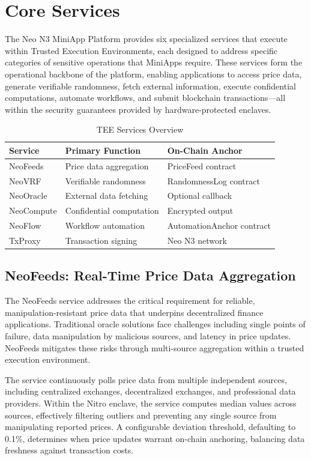 \documentclass[11pt,a4paper]{article}
\begin{document}
\section{Core Services}

The Neo N3 MiniApp Platform provides six specialized services that execute within Trusted Execution Environments, each designed to address specific categories of sensitive operations that MiniApps require. These services form the operational backbone of the platform, enabling applications to access price data, generate verifiable randomness, fetch external information, execute confidential computations, automate workflows, and submit blockchain transactions---all within the security guarantees provided by hardware-protected enclaves.

\begin{table}[h]
\centering
\caption{TEE Services Overview}
\begin{tabular}{@{}lll@{}}
\toprule
\textbf{Service} & \textbf{Primary Function} & \textbf{On-Chain Anchor} \\
\midrule
NeoFeeds & Price data aggregation & PriceFeed contract \\
NeoVRF & Verifiable randomness & RandomnessLog contract \\
NeoOracle & External data fetching & Optional callback \\
NeoCompute & Confidential computation & Encrypted output \\
NeoFlow & Workflow automation & AutomationAnchor contract \\
TxProxy & Transaction signing & Neo N3 network \\
\bottomrule
\end{tabular}
\label{tab:tee-services}
\end{table}

\subsection{NeoFeeds: Real-Time Price Data Aggregation}

The NeoFeeds service addresses the critical requirement for reliable, manipulation-resistant price data that underpins decentralized finance applications. Traditional oracle solutions face challenges including single points of failure, data manipulation by malicious sources, and latency in price updates. NeoFeeds mitigates these risks through multi-source aggregation within a trusted execution environment.

The service continuously polls price data from multiple independent sources, including centralized exchanges, decentralized exchanges, and professional data providers. Within the Nitro enclave, the service computes median values across sources, effectively filtering outliers and preventing any single source from manipulating reported prices. A configurable deviation threshold, defaulting to 0.1\%, determines when price updates warrant on-chain anchoring, balancing data freshness against transaction costs.
\end{document}
